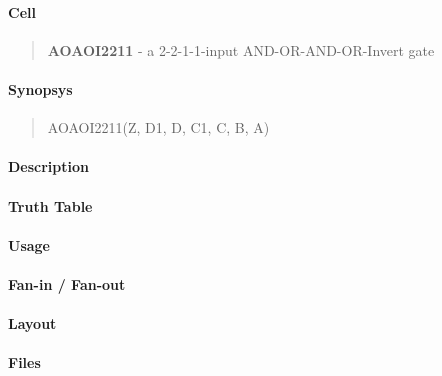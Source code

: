 \label{AOAOI2211}
\paragraph{Cell}
\begin{quote}
    \textbf{AOAOI2211} - a 2-2-1-1-input AND-OR-AND-OR-Invert gate
\end{quote}

\paragraph{Synopsys}
\begin{quote}
    AOAOI2211(Z, D1, D, C1, C, B, A)
\end{quote}

\paragraph{Description}

%

\paragraph{Truth Table}
%

\paragraph{Usage}

\paragraph{Fan-in / Fan-out}

\paragraph{Layout}

\paragraph{Files}
